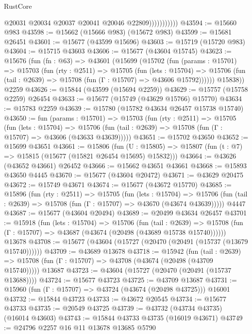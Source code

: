 \begin{lexlean}{RustCore}
\begin{coremodule}
                          @20031
                          @20034
                          @20037
                          @20041
                          @20046
                          @22809)))))))))))
@43594 := @15660 @983
@43598 := @15662 (@15666 @983) (@15672 @983)
@43599 := @15681 @26451
@43601 := @15677 (@43599 @15696)
@43603 := @15719 (@15720 @983)
@43604 := @15715 @43603
@43606 := @15677 (@43604 @15745)
@43623 := @15676
    (fun (fn : @63) =>
    @43601
      (@15699
        (@15702
          (fun (params : @15701) =>
          @15703
            (fun (rty : @2511) =>
            @15705
              (fun (lets : @15704) =>
              @15706 (fun (tail : @2639) => @15708 (fun (Γ : @15707) => @43606 @15792))))))
        @15838))
    @2259
@43626 := @15844 (@43599 (@15694 @2259))
@43629 := @15757 (@15758 @2259) @26454
@43633 := @15677 (@15749 (@43629 @15766) @15770)
@43634 := @15783 @2259
@43639 := @15780 (@15782 @43634 @26457 @15738 @15740)
@43650 := fun (params : @15701) =>
  @15703
    (fun (rty : @2511) =>
    @15705
      (fun (lets : @15704) =>
      @15706 (fun (tail : @2639) => @15708 (fun (Γ : @15707) => @43606 (@43633 @43639)))))
@43651 := @15702 @43650
@43652 := @15699 @43651
@43661 := @15806
    (fun (U : @15805) => @15807 (fun (t : @7) => @15815 (@15677 (@15821 @26454 @15695) @15832)))
@43664 := @43626 (@43652 @43661) @26452
@43666 := @15662 @43651 @43661
@43668 := @15893 @43650 @4445
@43670 := @15677 (@43604 @20472)
@43671 := @43629 @20475
@43672 := @15749 @43671
@43674 := @15677 (@43672 @15770)
@43685 := @15896
    (fun (rty : @2511) =>
    @15705
      (fun (lets : @15704) =>
      @15706 (fun (tail : @2639) => @15708 (fun (Γ : @15707) => @43670 (@43674 @43639)))))
    @4447
@43687 := @15677 (@43604 @20494)
@43689 := @20499 @43634 @26457
@43701 := @15918
    (fun (lets : @15704) =>
    @15706
      (fun (tail : @2639) =>
      @15708 (fun (Γ : @15707) => @43687 (@43674 (@20498 (@43689 @15738 @15740))))))
    @13678
@43708 := @15677 (@43604 (@15727 (@20470 (@20491 (@15737 (@13679 @15740))))))
@43709 := @43689 @13678
@43718 := @15942
    (fun (tail : @2639) => @15708 (fun (Γ : @15707) => @43708 (@43674 (@20498 (@43709 @15740)))))
    @13687
@43723 := @43604 (@15727 (@20470 (@20491 (@15737 @13688))))
@43724 := @15677 @43723
@43725 := @43709 @13687
@43731 := @15960 (fun (Γ : @15707) => @43724 (@43674 (@20498 @43725))) @16001
@43732 := @15844 @43723
@43733 := @43672 @20545
@43734 := @15677 @43733
@43735 := @20549 @43725
@43739 := @43732 (@43734 @43735) (@16014 @43603)
@43743 := @15844 @43733 @43735 (@16019 @43671)
@43749 := @24796 @2257 @16 @11 @13678 @13685 @5790

\end{coremodule}
\end{lexlean}
